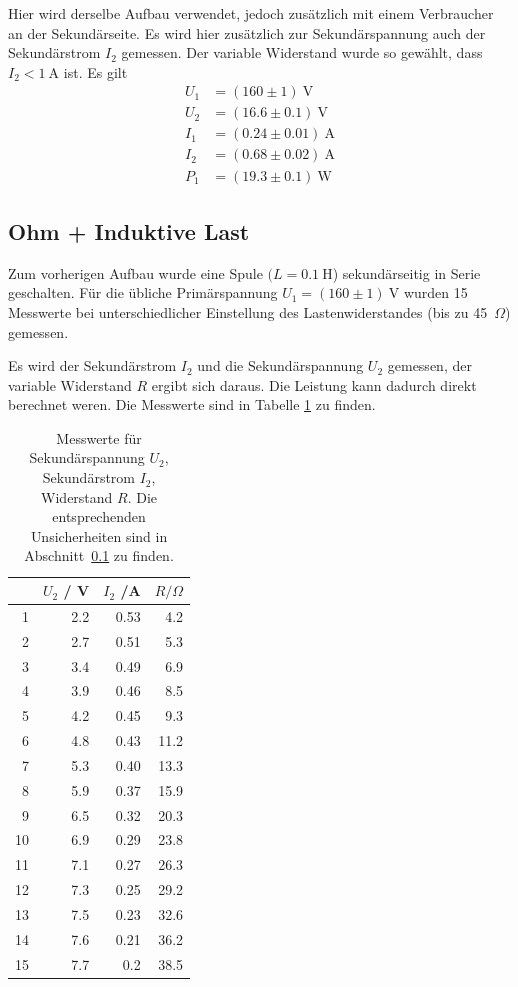 \documentclass{article}
\newcommand{\W}{\text{W}}
\newcommand{\V}{\text{V}}
\newcommand{\A}{\text{A}}
\begin{document}
Hier wird derselbe Aufbau verwendet, jedoch zusätzlich mit einem Verbraucher an der Sekundärseite. Es wird hier zusätzlich zur Sekundärspannung auch der Sekundärstrom $I_2$ gemessen. Der variable Widerstand wurde so gewählt, dass $I_2 < 1~\A$ ist. Es gilt
\begin{align*}
U_1 &= (160 \pm 1)~\V \\
U_2 &= (16.6 \pm 0.1)~\V \\
I_1 &= (0.24 \pm 0.01)~\A \\
I_2 &= (0.68 \pm 0.02)~\A \\
P_1 &= (19.3\pm0.1)~\W
\end{align*}





\subsection{Ohm + Induktive Last}
\label{sec:ohm_ind}

Zum vorherigen Aufbau wurde eine Spule $(L=0.1~$H) sekundärseitig in Serie geschalten. Für die übliche Primärspannung $U_1 = (160\pm1)~\V$ wurden 15 Messwerte bei unterschiedlicher Einstellung des Lastenwiderstandes (bis zu 45~$\Omega$) gemessen. 

Es wird der Sekundärstrom $I_2$ und die Sekundärspannung $U_2$ gemessen, der variable Widerstand $R$ ergibt sich daraus. Die Leistung kann dadurch direkt berechnet weren. Die Messwerte sind in Tabelle \ref{tab:spule} zu finden.

\begin{table}[H]
\centering
\caption{Messwerte für Sekundärspannung $U_2$, Sekundärstrom $I_2$, Widerstand $R$. Die entsprechenden Unsicherheiten sind in Abschnitt~\ref{sec:ohm_ind} zu finden.}
\label{tab:spule}
\begin{tabular}{r|rrr}
  &	$U_2$ / V  &	$I_2$ /A  &	$R / \Omega$\\
  \hline
1 &	2.2	&0.53	&	4.2	 \\
2 &	2.7	&0.51	&	5.3	 \\
3 &	3.4	&0.49	&	6.9   \\
4 &	3.9	&0.46	&	8.5	  \\
5 &	4.2	&0.45	&	9.3	  \\
6 &	4.8	&0.43	&	11.2	  \\
7 &	5.3	&0.40	&   13.3  \\
8 &	5.9	&0.37	&	15.9	 \\
9 &	6.5	&0.32	&	20.3	 \\
10&	6.9	&0.29	&	23.8	 \\
11&	7.1	&0.27	&	26.3	  \\
12&	7.3	&0.25	&	29.2	  \\
13&	7.5	&0.23	&	32.6	 \\
14&	7.6	&0.21	&	36.2  \\
15&	7.7	&0.2		&   38.5 
\end{tabular}

\end{table}
\end{document}
